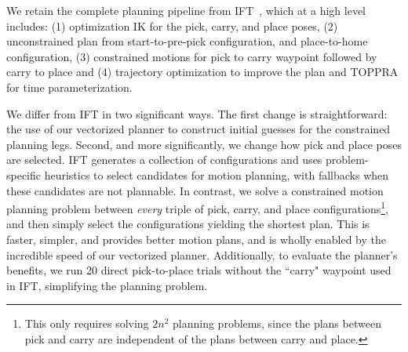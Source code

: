 \documentclass[letterpaper, 10 pt, conference]{ieeeconf}
\begin{document}
We retain the complete planning pipeline from IFT~\cite{cohn2026planning}, which at a high level includes: (1) optimization IK for the pick, carry, and place poses, (2) unconstrained plan from start-to-pre-pick configuration, and place-to-home configuration, (3) constrained motions for pick to carry waypoint followed by carry to place and (4) trajectory optimization to improve the plan and TOPPRA for time parameterization.

We differ from IFT in two significant ways.
The first change is straightforward: the use of our vectorized planner to construct initial guesses for the constrained planning legs. Second, and more significantly, we change how pick and place poses are selected. IFT generates a collection of configurations and uses problem-specific heuristics to select candidates for motion planning, with fallbacks when these candidates are not plannable.
In contrast, we solve a constrained motion planning problem between \emph{every} triple of pick, carry, and place configurations\footnote{
    This only requires solving $2n^2$ planning problems, since the plans between pick and carry are independent of the plans between carry and place.
}, and then simply select the configurations yielding the shortest plan.
This is faster, simpler, and provides better motion plans, and is wholly enabled by the incredible speed of our vectorized planner.
Additionally, to evaluate the planner's benefits, we run 20 direct pick-to-place trials without the ``carry" waypoint used in IFT, simplifying the planning problem. 

\end{document}
